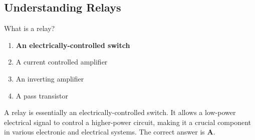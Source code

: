 \subsection{Understanding Relays}
\label{T6D02}

\begin{tcolorbox}[colback=gray!10!white,colframe=black!75!black,title=T6D02]
What is a relay?
\begin{enumerate}[noitemsep]
    \item \textbf{An electrically-controlled switch}
    \item A current controlled amplifier
    \item An inverting amplifier
    \item A pass transistor
\end{enumerate}
\end{tcolorbox}

A relay is essentially an electrically-controlled switch. It allows a low-power electrical signal to control a higher-power circuit, making it a crucial component in various electronic and electrical systems. The correct answer is \textbf{A}.